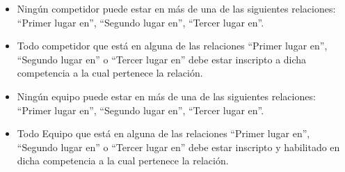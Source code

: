 \begin{itemize}
\item Ningún competidor puede estar en más de una de las siguientes relaciones: ``Primer lugar en'', ``Segundo lugar en'', ``Tercer lugar en''.
\item Todo competidor que está en alguna de las relaciones ``Primer lugar en'', ``Segundo lugar en'' o ``Tercer lugar en'' debe estar inscripto a dicha competencia a la cual pertenece la relación.
\item Ningún equipo puede estar en más de una de las siguientes relaciones: ``Primer lugar en'', ``Segundo lugar en'', ``Tercer lugar en''.
\item Todo Equipo que está en alguna de las relaciones ``Primer lugar en'', ``Segundo lugar en'' o ``Tercer lugar en'' debe estar inscripto y habilitado en dicha competencia a la cual pertenece la relación.
\end{itemize}

